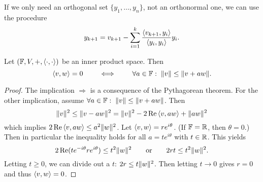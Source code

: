 If we only need an orthogonal set $\{y_1,\ldots,y_n\}$, not an orthonormal one, we can use the procedure
\[ y_{k+1} = v_{k+1} - \sum_{i=1}^k \frac{\left\langle v_{k+1}, y_i \right\rangle}{\left\langle y_i,y_i \right\rangle}y_i. \]

\begin{lemma} \label{lemma:orthogonality}
Let $(\mathbb{F}, V,+,\left\langle \cdot,\cdot \right\rangle)$ be an inner product space. Then
\[ \left\langle v,w \right\rangle=0 \qquad \iff \qquad \forall a\in\mathbb{F}:\;\lVert v\rVert\leq\lVert v+aw\rVert.  \]
\end{lemma}
\begin{proof}
The implication $\Rightarrow$ is a consequence of the Pythagorean theorem. For the other implication, assume $\forall a\in\mathbb{F}:\;\lVert v\rVert\leq\lVert v+aw\rVert$. Then
\[ \lVert v\rVert^2 \leq \lVert v-aw\rVert^2 = \lVert v\rVert^2 - 2\operatorname{Re}\left\langle v,aw \right\rangle + \lVert aw\rVert^2 \]
which implies $2\operatorname{Re}\left\langle v,aw \right\rangle \leq a^2\lVert w\rVert^2$. Let $\left\langle v,w \right\rangle = re^{i\theta}$. (If $\mathbb{F} = \mathbb{R}$, then $\theta=0$.) Then in particular the inequality holds for all $a=te^{i\theta}$ with $t\in\mathbb{R}$. This yields
\[ 2\operatorname{Re}(te^{-i\theta}re^{i\theta}) \leq t^2\lVert w\rVert^2 \qquad \text{or}\qquad 2rt\leq t^2\lVert w\rVert^2. \]
Letting $t\geq 0$, we can divide out a $t$: $2r\leq t\lVert w\rVert^2$. Then letting $t\to 0$ gives $r=0$ and thus $\left\langle v,w \right\rangle=0$.
\end{proof}

